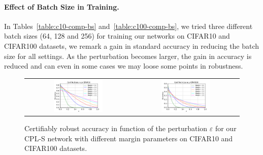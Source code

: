 \begin{table}[h]
\begin{tabular}
  \bottomrule
  \end{tabular}%
  \caption{Results on the CIFAR100 dataset on standard and  provably certifiable accuracies for different values of perturbations $\varepsilon$ on CPL (ours) models with various batch sizes. The average time per epoch in seconds is also reported in the last column. All the reported networks use Last Layer Normalization.}
  \label{table:c100-comp-bs}%
\end{table}%

\paragraph{Effect of Batch Size in Training.}
In Tables~\ref{table:c10-comp-bs} and~\ref{table:c100-comp-bs}, we tried three different batch sizes (64, 128 and 256) for training our networks on CIFAR10 and CIFAR100 datasets, we remark a gain in standard accuracy in reducing the batch size for all settings. As the perturbation becomes larger, the gain in accuracy is reduced and can even in some cases we may loose some points in robustness.





\begin{figure}[h]
    \centering
    \begin{tabular}{cc}
    \includegraphics[width=0.48\textwidth]{sections/4_certification/images/cert_acc_margin_eps_c10.pdf}&\includegraphics[width=0.48\textwidth]{sections/4_certification/images/cert_acc_margin_eps_c100.pdf}
    \end{tabular}
    \caption{Certifiably robust accuracy in function of the perturbation $\varepsilon$ for our CPL-S  network with different margin parameters on CIFAR10 and CIFAR100 datasets.}
    \label{fig:cert-acc-margin}
\end{figure}


